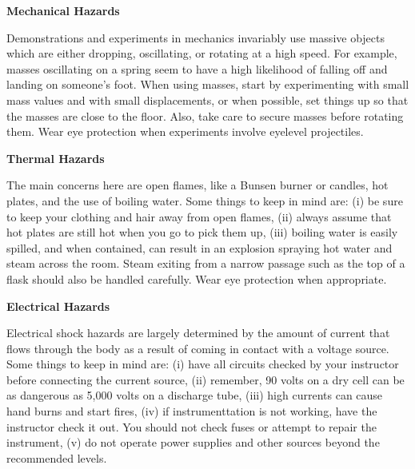 \begin{enumerate}	
{\Large \item \textbf{Mechanical Hazards}}

Demonstrations and experiments in mechanics invariably use massive objects which are either dropping, oscillating, or rotating at a high speed.  For example, masses oscillating on a spring seem to have a high likelihood of falling off and landing on someone's foot. When using masses, start by experimenting with small mass values and with small displacements, or when possible, set things up so that the masses are close to the floor. Also, take care to secure masses before rotating them. Wear eye protection when experiments involve eyelevel projectiles.

{\Large \item \textbf{Thermal Hazards}}

The main concerns here are open flames, like a Bunsen burner or candles, hot plates, and the use of boiling water. Some things to keep in mind are: (i) be sure to keep your clothing and hair away from open flames, (ii) always assume that hot plates are still hot when you go to pick them up, (iii) boiling water is easily spilled, and when contained, can result in an explosion spraying hot water and steam across the room. Steam exiting from a narrow passage such as the top of a flask should also be handled carefully. Wear eye protection when appropriate.

{\Large \item \textbf{Electrical Hazards}}

Electrical shock hazards are largely determined by the amount of current that flows through the body as a result of coming in contact with a voltage source. Some things to keep in mind are: (i) have all circuits checked by your instructor before connecting the current source, (ii) remember, 90 volts on a dry cell can be as dangerous as 5,000 volts on a discharge tube, (iii) high currents can cause hand burns and start fires, (iv) if instrumenttation is not working, have the instructor check it out. You should not check fuses or attempt to repair the instrument, (v) do not operate power supplies and other sources beyond the recommended levels.


\end{enumerate}

